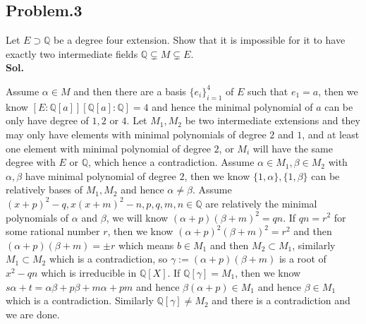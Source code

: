 \documentclass[lang=en,11pt,a4paper,citestyle =authoryear]{elegantpaper}
\begin{document}
\subsection*{Problem.3} 
Let $E \supset \mathbb{Q}$ be a degree four extension. Show that it is impossible for it to have exactly two intermediate fields
$\mathbb{Q} \subsetneq M \subsetneq E$.\\
\vspace{0.5em}
\textbf{Sol.} \par
    Assume $\alpha \in M$ and then there are a basis $\{e_i\}_{i=1}^4$ of $E$ such that $e_1 = a$, then we know $[E:\mathbb{Q}[a]][\mathbb{Q}[a]:\mathbb{Q}] = 4$ and hence the minimal polynomial of $a$ can be only have degree of $1,2$ or $4$. Let $M_1,M_2$ be two intermediate extensions and they may only have elements with minimal polynomials of degree $2$ and $1$, and at least one element with minimal polynomial of degree $2$, or $M_i$ will have the same degree with $E$ or $\mathbb{Q}$, which hence a contradiction. Assume $\alpha \in M_1, \beta \in M_2$ with $\alpha,\beta$ have minimal polynomial of degree $2$, then we know $\{1,\alpha\},\{1,\beta\}$ can be relatively bases of $M_1,M_2$ and hence $\alpha \neq \beta$. Assume $(x+p)^2-q , x(x+m)^2-n, p,q,m,n\in \mathbb{Q}$ are relatively the minimal polynomials of $\alpha$ and $\beta$, we will know $(\alpha+p)(\beta+m)^2 = qn$. If $qn = r^2$ for some rational number $r$, then we know $(\alpha+p)^2(\beta+m)^2 = r^2$ and then $(\alpha+p)(\beta+m) = \pm r$ which means $b\in M_1$ and then $M_2\subset M_1$, similarly $M_1\subset M_2$ which is a contradiction, so $\gamma:=(\alpha+p)(\beta+m)$ is a root of $x^2 - qn$ which is irreducible in $\mathbb{Q}[X]$. If $\mathbb{Q}[\gamma] = M_1$, then we know $s\alpha+t = \alpha\beta + p\beta+m\alpha+pm$ and hence $\beta(\alpha+p) \in M_1$ and hence $\beta \in M_1$ which is a contradiction. Similarly $\mathbb{Q}[\gamma] \neq M_2$ and there is a contradiction and we are done.
\vspace{0.5em}
\end{document}
